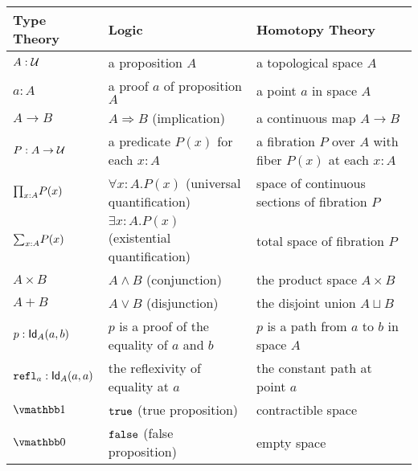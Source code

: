 \begin{table}[htbp]
    \begin{tabularx}
        {\textwidth}
        {>{\raggedright\arraybackslash}p{}>{\raggedright\arraybackslash}p{}>{\raggedright\arraybackslash}p{}}
        \toprule
        \textbf{Type Theory}    & \textbf{Logic}                                  & \textbf{Homotopy Theory}                                 \\
        \midrule
        $A:\mathcal{U}$                  & a proposition $A$                               & a topological space $A$                                  \\
        $a:A$                   & a proof $a$ of proposition $A$                  & a point $a$ in space $A$                                 \\
        $A\to B$                & $A\Rightarrow B$ (implication)                  & a continuous map $A\to B$                                \\
        $P : A \to \mathcal{U}$          & a predicate $P(x)$ for each $x:A$               & a fibration $P$ over $A$ with fiber $P(x)$ at each $x:A$ \\
        $\textstyle\mathbf{\prod}_{x:A}P(x)$       & $\forall x:A.P(x)$ (universal quantification)   & space of continuous sections of fibration $P$            \\
        $\textstyle\mathbf{\sum}_{x:A}P(x)$        & $\exists x:A.P(x)$ (existential quantification) & total space of fibration $P$                             \\
        $A\times B$             & $A\land B$ (conjunction)                        & the product space $A\times B$                            \\
        $A+ B$                  & $A\lor B$ (disjunction)                         & the disjoint union $A\sqcup B$                           \\
        $p:\textsf{Id}_A(a,b)$          & $p$ is a proof of the equality of $a$ and $b$   & $p$ is a path from $a$ to $b$ in space $A$               \\
        $\texttt{refl}_a : \textsf{Id}_A(a,a)$  & the reflexivity of equality at $a$              & the constant path at point $a$                           \\
        $\One$                  & $\texttt{true}$ (true proposition)                      & contractible space                                       \\
        $\Zero$                 & $\texttt{false}$ (false proposition)                    & empty space                                              \\

\end{tabularx}
\end{table}
